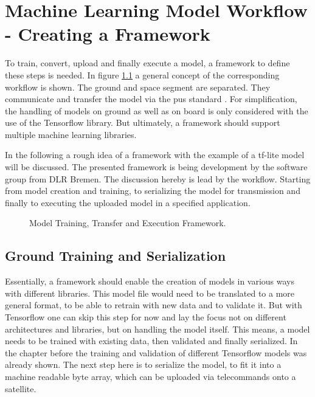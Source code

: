 \chapter{Machine Learning Model Workflow - Creating a Framework}
To train, convert, upload and finally execute a model, a framework to define these steps is needed. In figure \ref{f:model_framework} a general concept of the corresponding workflow is shown. The ground and space segment are separated. They communicate and transfer the model via the \acf{pus} standard \cite{pus}. \newline
For simplification, the handling of models on ground as well as on board is only considered with the use of the Tensorflow library. But ultimately, a framework should support multiple machine learning libraries.

In the following a rough idea of a framework with the example of a tf-lite model will be discussed. The presented framework is being development by the software group from DLR Bremen. \newline
The discussion hereby is lead by the workflow. Starting from model creation and training, to serializing the model for transmission and finally to executing the uploaded model in a specified application.

\begin{figure}[htb]
\centering

\caption{Model Training, Transfer and Execution Framework.}
\label{f:model_framework}
\end{figure}

\section{Ground Training and Serialization}
Essentially, a framework should enable the creation of models in various ways with different libraries. This model file would need to be translated to a more general format, to be able to retrain with new data and to validate it. But with Tensorflow one can skip this step for now and lay the focus not on different architectures and libraries, but on handling the model itself. \newline
This means, a model needs to be trained with existing data, then validated and finally serialized. In the chapter before the training and validation of different Tensorflow models was already shown. The next step here is to serialize the model, to fit it into a machine readable byte array, which can be uploaded via telecommands onto a satellite.

